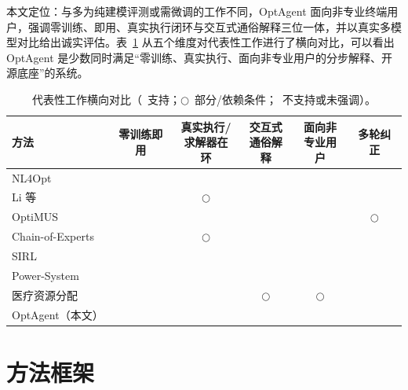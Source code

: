 \documentclass[11pt]{article}
\newcommand{\yes}{\textcolor{layExecB}{\ding{51}}}
\newcommand{\no}{\textcolor{cMoon}{\ding{55}}}
\newcommand{\pt}{\textcolor{layUserB}{$\bigcirc$}}
\begin{document}
本文定位：与多为纯建模评测或需微调的工作不同，OptAgent 面向非专业终端用户，强调零训练、即用、真实执行闭环与交互式通俗解释三位一体，并以真实多模型对比给出诚实评估。表~\ref{tab:related} 从五个维度对代表性工作进行了横向对比，可以看出 OptAgent 是少数同时满足“零训练、真实执行、面向非专业用户的分步解释、开源底座”的系统。

\begin{table}[t]
\centering
\caption{代表性工作横向对比（\yes~支持；\pt~部分/依赖条件；\no~不支持或未强调）。}
\label{tab:related}
\small
\renewcommand{\arraystretch}{1.15}
\setlength{\tabcolsep}{4pt}
\begin{tabular}{lccccc}
\toprule
方法 & 零训练即用 & \makecell{真实执行/\\求解器在环} & \makecell{交互式\\通俗解释} & \makecell{面向非\\专业用户} & 多轮纠正 \\
\midrule
NL4Opt~\cite{ramamonjison2023nl4opt}       & \no & \no & \no & \no & \no \\
Li 等~\cite{li2023synthesizing}            & \yes & \pt & \no & \no & \no \\
OptiMUS~\cite{ahmaditeshnizi2024optimus}    & \yes & \yes & \no & \no & \pt \\
Chain-of-Experts~\cite{xiao2024chainofexperts} & \yes & \pt & \no & \no & \no \\
SIRL~\cite{chen2025sirl}                    & \no & \yes & \no & \no & \no \\
Power-System~\cite{hu2025power}             & \yes & \yes & \no & \no & \yes \\
医疗资源分配~\cite{wan2025healthcare}         & \yes & \yes & \pt & \pt & \no \\
OptAgent（本文）                    & \yes & \yes & \yes & \yes & \yes \\
\bottomrule
\end{tabular}
\end{table}

\section{方法框架}\label{sec:method}
\end{document}
